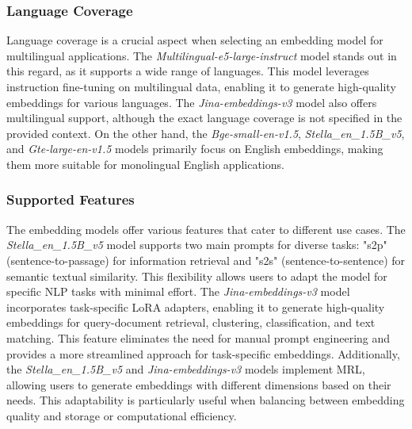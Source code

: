 \subsubsection{Language Coverage}
Language coverage is a crucial aspect when selecting an embedding model for multilingual applications. The \textit{Multilingual-e5-large-instruct} model stands out in this regard, as it supports a wide range of languages. This model leverages instruction fine-tuning on multilingual data, enabling it to generate high-quality embeddings for various languages.
The \textit{Jina-embeddings-v3} model also offers multilingual support, although the exact language coverage is not specified in the provided context. On the other hand, the \textit{Bge-small-en-v1.5}, \textit{Stella\_en\_1.5B\_v5}, and \textit{Gte-large-en-v1.5} models primarily focus on English embeddings, making them more suitable for monolingual English applications.

\subsubsection{Supported Features}
The embedding models offer various features that cater to different use cases. The \textit{Stella\_en\_1.5B\_v5} model supports two main prompts for diverse tasks: "s2p" (sentence-to-passage) for information retrieval and "s2s" (sentence-to-sentence) for semantic textual similarity. This flexibility allows users to adapt the model for specific NLP tasks with minimal effort.
The \textit{Jina-embeddings-v3} model incorporates task-specific LoRA adapters, enabling it to generate high-quality embeddings for query-document retrieval, clustering, classification, and text matching. This feature eliminates the need for manual prompt engineering and provides a more streamlined approach for task-specific embeddings.
Additionally, the \textit{Stella\_en\_1.5B\_v5} and \textit{Jina-embeddings-v3} models implement MRL, allowing users to generate embeddings with different dimensions based on their needs. This adaptability is particularly useful when balancing between embedding quality and storage or computational efficiency.

